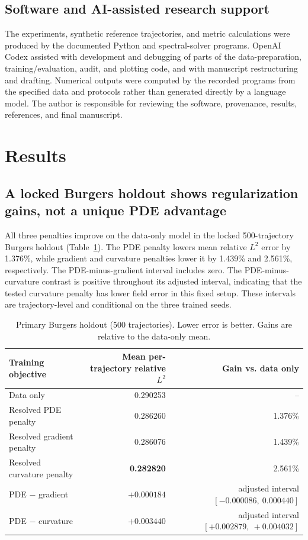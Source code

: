 \documentclass[a4paper,fleqn]{cas-sc}
\begin{document}
\subsection{Software and AI-assisted research support}
The experiments, synthetic reference trajectories, and metric calculations were produced by the documented Python and spectral-solver programs. OpenAI Codex assisted with development and debugging of parts of the data-preparation, training/evaluation, audit, and plotting code, and with manuscript restructuring and drafting. Numerical outputs were computed by the recorded programs from the specified data and protocols rather than generated directly by a language model. The author is responsible for reviewing the software, provenance, results, references, and final manuscript.

\section{Results}
\subsection{A locked Burgers holdout shows regularization gains, not a unique PDE advantage}
All three penalties improve on the data-only model in the locked 500-trajectory Burgers holdout (Table~\ref{tab:burgers-confirm}). The PDE penalty lowers mean relative $L^2$ error by 1.376\%, while gradient and curvature penalties lower it by 1.439\% and 2.561\%, respectively. The PDE-minus-gradient interval includes zero. The PDE-minus-curvature contrast is positive throughout its adjusted interval, indicating that the tested curvature penalty has lower field error in this fixed setup. These intervals are trajectory-level and conditional on the three trained seeds.

\begin{table}
\centering\small
\caption{Primary Burgers holdout (500 trajectories). Lower error is better. Gains are relative to the data-only mean.}
\label{tab:burgers-confirm}
\begin{tabular}{lrr}
\toprule
Training objective & Mean per-trajectory relative $L^2$ & Gain vs. data only \\
\midrule
Data only & 0.290253 & -- \\
Resolved PDE penalty & 0.286260 & 1.376\% \\
Resolved gradient penalty & 0.286076 & 1.439\% \\
Resolved curvature penalty & \textbf{0.282820} & 2.561\% \\
\midrule
PDE $-$ gradient & $+0.000184$ & adjusted interval $[-0.000086,\ 0.000440]$ \\
PDE $-$ curvature & $+0.003440$ & adjusted interval $[+0.002879,\ +0.004032]$ \\
\bottomrule
\end{tabular}
\end{table}
\end{document}
